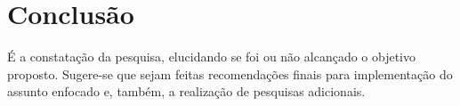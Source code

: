 \chapter[Conclusão]{Conclusão}

É a constatação da pesquisa, elucidando se foi ou não alcançado o objetivo proposto. Sugere-se que sejam feitas recomendações finais para implementação do assunto enfocado e, também, a realização de pesquisas adicionais. 